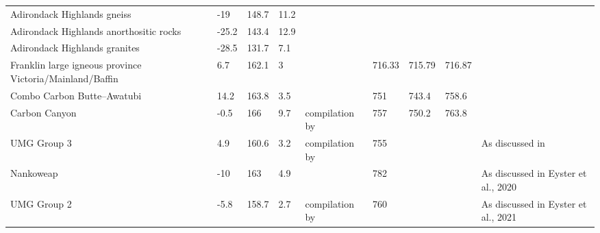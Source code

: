 \documentclass[11pt,letterpaper]{article}
\begin{document}
\begin{table}
\begin{scriptsize}
\begin{tabular}{p{4cm}lllp{4cm}lllp{4cm}}
Adirondack Highlands gneiss                                & -19      & 148.7    & 11.2 & \cite{Brown2012a}                                                &            &          &          &                                                     \\
Adirondack Highlands anorthositic rocks                    & -25.2    & 143.4    & 12.9 & \cite{Brown2012a}                                                &            &          &          &                                                     \\
Adirondack Highlands granites                              & -28.5    & 131.7    & 7.1  & \cite{Brown2012a}                                                &            &          &          &                                                     \\
Franklin large igneous province   Victoria/Mainland/Baffin & 6.7      & 162.1    & 3    & \cite{Denyszyn2009a}                                                   & 716.33     & 715.79   & 716.87   &                                                     \\
Combo Carbon Butte–Awatubi                                 & 14.2     & 163.8    & 3.5  & \cite{Eyster2019a}                                                   & 751        & 743.4    & 758.6    &                                                     \\
Carbon Canyon                                              & -0.5     & 166      & 9.7  & compilation by \cite{Eyster2019a}                                    & 757        & 750.2    & 763.8    &                                                     \\
UMG Group 3                                                & 4.9      & 160.6    & 3.2  & compilation by \cite{Eyster2019a}                                    & 755        &          &          & As discussed in \cite{Eyster2019a}                \\
Nankoweap                                                  & -10      & 163      & 4.9  & \cite{Weil2003a}                                                     & 782        &          &          & As discussed in Eyster et al., 2020                 \\
UMG Group 2                                                & -5.8     & 158.7    & 2.7  & compilation by \cite{Eyster2019a}                                    & 760        &          &          & As discussed in Eyster et al., 2021                 \\

\end{tabular}
\end{scriptsize}
\end{table}
\end{document}
